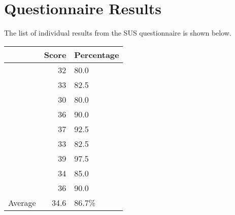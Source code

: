 \section{Questionnaire Results}
\label{app:questionnaire_results}

The list of individual results from the SUS questionnaire is shown below.

\renewcommand{\arraystretch}{1.3}
\begin{longtabu}{rrl}
	\toprule
	& Score & Percentage \\
	\midrule
& 32 & 80.0 \\
& 33 & 82.5 \\
& 30 & 80.0 \\
& 36 & 90.0 \\
& 37 & 92.5 \\
& 33 & 82.5 \\
& 39 & 97.5 \\
& 34 & 85.0 \\
& 36 & 90.0 \\ \midrule
Average & 34.6 & 86.7\% \\
	\bottomrule
\end{longtabu}
